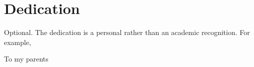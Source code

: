 
\chapter{Dedication}

Optional. The dedication is a personal rather than an academic recognition.
For example,

\vspace{1in}
\begin{flushright}
{\selectfont
\huge{To my parents}
}
\end{flushright}
